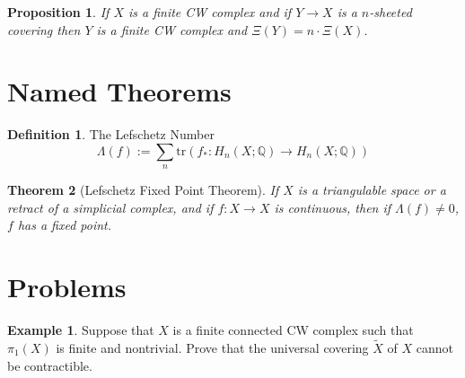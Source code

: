 \documentclass[a4paper]{article}
\theoremstyle{theorem}
\newtheorem{theorem}{Theorem}[section]
\newtheorem{proposition}[theorem]{Proposition}
\theoremstyle{definition}
\newtheorem{definition}{Definition} [section]
\newtheorem{example}{Example}
\theoremstyle{remark}
\theoremstyle{gremark}
\theoremstyle{discussion}
\theoremstyle{notation}
\begin{document}
\begin{proposition}
	If $X$ is a finite CW complex and if $Y\to X$ is a $n$-sheeted covering then $Y$ is a finite CW complex and $\Xi(Y)=n\cdot\Xi(X)$. 
\end{proposition}


\pagebreak

\section{Named Theorems}

\begin{definition}
	The Lefschetz Number
	$$\Lambda(f):=\sum_n \textrm{tr}(f_*:H_n(X;\mathbb{Q})\to H_n(X;\mathbb{Q})) $$
\end{definition}

\begin{theorem}[Lefschetz Fixed Point Theorem]
	If $X$ is a triangulable space or a retract of a simplicial complex, and if $f:X\to X$ is continuous, then if $\Lambda(f)\neq 0$, $f$ has a fixed point.
\end{theorem}

\pagebreak

\section{Problems}

\begin{example}
	Suppose that $X$ is a finite connected CW complex such that $\pi_1(X)$ is finite and nontrivial. Prove that the universal covering $\widetilde{X}$ of $X$ cannot be contractible.
\end{example}
\end{document}
